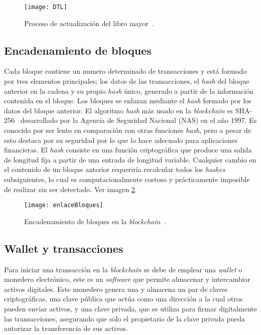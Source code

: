 \begin{figure}[h]
	\label{img:DTL}
	\centering
	\texttt{[image: DTL]}
	\caption[Libro mayor digital]{Proceso de actualización del libro mayor~\cite{BlockchainFuncionamiento}.}
\end{figure}

\subsection{Encadenamiento de bloques}

Cada bloque contiene un numero determinado de transacciones y está formado por tres elementos principales; los datos de las transacciones, el \textit{hash} del bloque anterior en la cadena  y su propio \textit{hash} único, generado a partir de la información contenida en el bloque.
Los bloques se enlazan mediante el \textit{hash} formado por los datos del bloque anterior.
El algoritmo \textit{hash} más usado en la \textit{blockchain} es SHA-256~\cite{sha256} desarrollado por la Agencia de Seguridad Nacional (NAS) en el año 1997. Es conocido por ser lento en comparación con otras funciones \textit{hash}, pero a pesar de esto destaca por su seguridad por lo que lo hace adecuado para aplicaciones financieras.
El \textit{hash} consiste en una función criptográfica que produce una salida de longitud fija a partir de una entrada de longitud variable. Cualquier cambio en el contenido de un bloque anterior requeriría recalcular todos los \textit{hashes} subsiguientes, lo cual es computacionalmente costoso y prácticamente imposible de realizar sin ser detectado.
Ver imagen \ref{img:enlaceBloques}.

\begin{figure}[h]
	\label{img:enlaceBloques}
	\centering
	\texttt{[image: enlaceBloques]}
	\caption[Encadenamiento bloques blockchain]{Encadenamiento de bloques en la \textit{blockchain}~\cite{BlockchainFuncionamiento}.}
\end{figure}

\subsection{Wallet y transacciones}

Para iniciar una transacción en la \textit{blockchain} se debe de emplear una \textit{wallet} o monedero electrónico, este es un \textit{software} que permite almacenar y intercambiar activos digitales.
Este monedero genera una y almacena un par de claves criptográficas, una clave pública que actúa como una dirección a la cual otros pueden enviar activos, y una clave privada, que se utiliza para firmar digitalmente las transacciones, asegurando que solo el propietario de la clave privada pueda autorizar la transferencia de sus activos.

